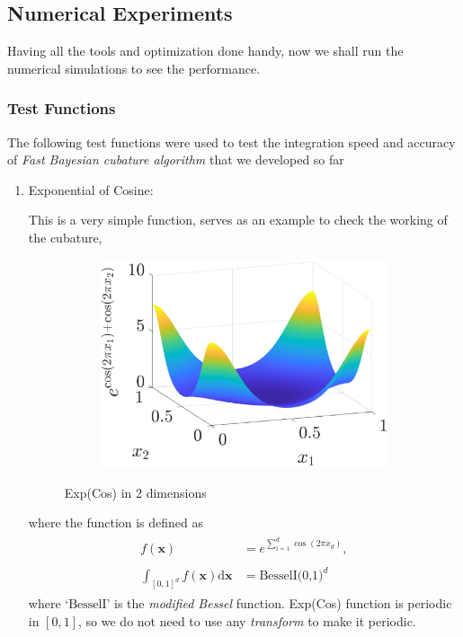 \documentclass[twocolumn]{svjour3}          %
\newcommand{\bm}[1]{\boldsymbol{#1}}
\newcommand{\dif}[1]{\text{d}{#1}}
\newcommand{\vx}{\bm{x}}
\newcommand{\dvx}{\dif{\bm{x}}}
\begin{document}
\subsection{Numerical Experiments}
\label{sec:numerical_experiments}

Having all the tools and optimization done handy, now we shall run the numerical simulations to see the performance.

\subsubsection{Test Functions}

The following test functions were used to test the integration speed and accuracy of \textit{Fast Bayesian cubature algorithm} that we developed so far

\begin{enumerate}
\item Exponential of Cosine: 

This is a very simple function, serves as an example to check the working of the cubature,
\begin{figure}[H]
\linespread{0.7}
\centering
\captionsetup[subfigure]{labelformat=empty}
\begin{subfigure}[b]{0.48\textwidth}
\includegraphics[width=\textwidth]{ExpCos}
\end{subfigure}
\caption{Exp(Cos) in 2 dimensions}
\label{fig:Exp(Cos)}
\end{figure}
where the function is defined as
\begin{align*}
\begin{matrix}
f(\vx) &= e^{\sum_{i=1}^d\cos(2 \pi x_d)},  
\\
\\
\int_{[0,1]^d} f(\vx) \dvx &= \text{BesselI(0,1)}^d
\end{matrix}
\end{align*}
where `$\text{BesselI}$' is the \textit{modified Bessel} function. Exp(Cos) function is periodic in $[0,1]$, so we do not need to use any \textit{transform} to make it periodic.








\end{enumerate}
\end{document}
